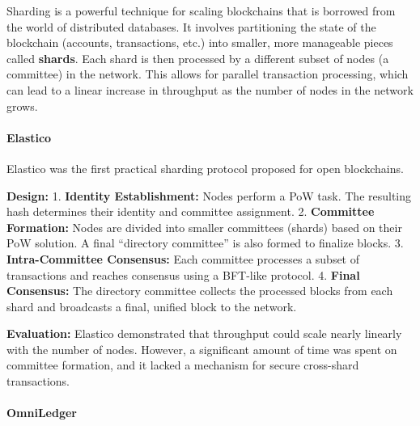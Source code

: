Sharding is a powerful technique for scaling blockchains that is
borrowed from the world of distributed databases. It involves
partitioning the state of the blockchain (accounts, transactions, etc.)
into smaller, more manageable pieces called \textbf{shards}. Each shard
is then processed by a different subset of nodes (a committee) in the
network. This allows for parallel transaction processing, which can lead
to a linear increase in throughput as the number of nodes in the network
grows.


\paragraph{Elastico}\label{elastico}

Elastico was the first practical sharding protocol proposed for open
blockchains.

\textbf{Design:} 1. \textbf{Identity Establishment:} Nodes perform a PoW
task. The resulting hash determines their identity and committee
assignment. 2. \textbf{Committee Formation:} Nodes are divided into
smaller committees (shards) based on their PoW solution. A final
``directory committee'' is also formed to finalize blocks. 3.
\textbf{Intra-Committee Consensus:} Each committee processes a subset of
transactions and reaches consensus using a BFT-like protocol. 4.
\textbf{Final Consensus:} The directory committee collects the processed
blocks from each shard and broadcasts a final, unified block to the
network.


\textbf{Evaluation:} Elastico demonstrated that throughput could scale
nearly linearly with the number of nodes. However, a significant amount
of time was spent on committee formation, and it lacked a mechanism for
secure cross-shard transactions.


\paragraph{OmniLedger}\label{omniledger}

